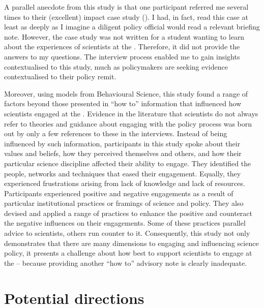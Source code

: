 A parallel anecdote from this study is that one participant referred me several times to their (excellent) impact case study (). I had, in fact, read this case at least as deeply as I imagine a diligent policy official would read a relevant briefing note. However, the case study was not written for a student wanting to learn about the experiences of scientists at the \CAN{} \SPI. Therefore, it did not provide the answers to my questions. The interview process enabled me to gain insights contextualised to this study, much as policymakers are seeking evidence contextualised to their policy remit. 

Moreover, using models from Behavioural Science, this study found a range of factors beyond those presented in ``how to'' information that influenced how scientists engaged at the \SPI. Evidence in the literature that scientists do not always refer to theories and guidance about engaging with the policy process was born out by only a few references to these in the interviews. Instead of being influenced by such information, participants in this study spoke about their values and beliefs, how they perceived themselves and others, and how their particular science discipline affected their ability to engage. They identified the people, networks and techniques that eased their engagement. Equally, they experienced frustrations arising from lack of knowledge and lack of resources. Participants experienced positive and negative engagements as a result of particular institutional practices or framings of \CAN{} science and policy. They also devised and applied a range of practices to enhance the positive and counteract the negative influences on their engagements. Some of these practices parallel advice to scientists, others run counter to it. Consequently, this study not only demonstrates that there are many dimensions to engaging and influencing \CAN{} science policy, it presents a challenge about how best to support scientists to engage at the \SPI{} -- because providing another ``how to'' advisory note is clearly inadequate.



\section{Potential directions}\label{sec:disdirections}

